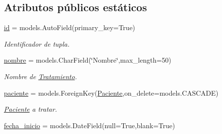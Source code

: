 \subsection*{Atributos públicos estáticos}
\begin{DoxyCompactItemize}
\item 
\hyperlink{classappEmotionIOT_1_1models_1_1Tratamiento_aa4cb0e37dc7dc81926ef56c4d4b309b6}{id} = models.\+Auto\+Field(primary\+\_\+key=True)\hypertarget{classappEmotionIOT_1_1models_1_1Tratamiento_aa4cb0e37dc7dc81926ef56c4d4b309b6}{}\label{classappEmotionIOT_1_1models_1_1Tratamiento_aa4cb0e37dc7dc81926ef56c4d4b309b6}

\begin{DoxyCompactList}\small\item\em Identificador de tupla. \end{DoxyCompactList}\item 
\hyperlink{classappEmotionIOT_1_1models_1_1Tratamiento_ad6d88f1c6f020adba4e77087c5d5d8fa}{nombre} = models.\+Char\+Field(\char`\"{}Nombre\char`\"{},max\+\_\+length=50)\hypertarget{classappEmotionIOT_1_1models_1_1Tratamiento_ad6d88f1c6f020adba4e77087c5d5d8fa}{}\label{classappEmotionIOT_1_1models_1_1Tratamiento_ad6d88f1c6f020adba4e77087c5d5d8fa}

\begin{DoxyCompactList}\small\item\em Nombre de \hyperlink{classappEmotionIOT_1_1models_1_1Tratamiento}{Tratamiento}. \end{DoxyCompactList}\item 
\hyperlink{classappEmotionIOT_1_1models_1_1Tratamiento_a82a6db1ad35630c34cf2b75e11e70599}{paciente} = models.\+Foreign\+Key(\hyperlink{classappEmotionIOT_1_1models_1_1Paciente}{Paciente},on\+\_\+delete=models.\+C\+A\+S\+C\+A\+DE)\hypertarget{classappEmotionIOT_1_1models_1_1Tratamiento_a82a6db1ad35630c34cf2b75e11e70599}{}\label{classappEmotionIOT_1_1models_1_1Tratamiento_a82a6db1ad35630c34cf2b75e11e70599}

\begin{DoxyCompactList}\small\item\em \hyperlink{classappEmotionIOT_1_1models_1_1Paciente}{Paciente} a tratar. \end{DoxyCompactList}\item 
\hyperlink{classappEmotionIOT_1_1models_1_1Tratamiento_a2045bfe1d5caf8318b15185f13b79e70}{fecha\+\_\+inicio} = models.\+Date\+Field(null=True,blank=True)\hypertarget{classappEmotionIOT_1_1models_1_1Tratamiento_a2045bfe1d5caf8318b15185f13b79e70}{}\label{classappEmotionIOT_1_1models_1_1Tratamiento_a2045bfe1d5caf8318b15185f13b79e70}


\end{DoxyCompactItemize}
